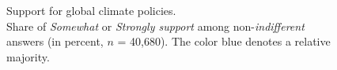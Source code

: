 \begin{figure} %
  \caption{Support for global climate policies. \\ Share of \textit{Somewhat} or \textit{Strongly support} among non-\textit{indifferent} answers (in percent, $n$ = 40,680). The color blue denotes a relative majority. } 
  \label{fig:oecd}
\end{figure}

